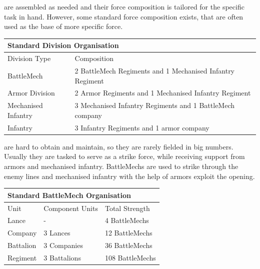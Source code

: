 \documentclass{tufte-book}
\begin{document}
 are assembled as needed and their force
composition is tailored for the specific task in hand. However, some
standard force composition exists, that are often used as the base of
more specific force.

\bigskip
\begin{minipage}{\textwidth}
\begin{center}
\begin{tabular}{ll}
\toprule
\multicolumn{2}{l}{Standard Division Organisation} \\
\midrule
Division Type & Composition \\
\midrule
BattleMech          & 2 BattleMech Regiments and 1 Mechanised Infantry Regiment \\
Armor Division      & 2 Armor Regiments and 1 Mechanised Infantry Regiment \\
Mechanised Infantry & 3 Mechanised Infantry Regiments and 1 BattleMech company\\
Infantry            & 3 Infantry Regiments and 1 armor company \\
\bottomrule
\end{tabular}
\end{center}
\end{minipage}

 are hard to obtain and maintain, so they are
rarely fielded in big numbers. Usually they are tasked to serve as a
strike force, while receiving support from armors and mechanised
infantry. BattleMechs are used to strike through the enemy lines and
mechanised infantry with the help of armors exploit the opening.

\bigskip
\begin{minipage}{\textwidth}
\begin{center}
\begin{tabular}{lll}
\toprule
\multicolumn{3}{l}{Standard BattleMech Organisation} \\
\midrule
Unit & Component Units & Total Strength \\
\midrule
Lance     & -            & 4 BattleMechs \\
Company   & 3 Lances     & 12 BattleMechs \\
Battalion & 3 Companies  & 36 BattleMechs \\
Regiment  & 3 Battalions & 108 BattleMechs \\
\bottomrule
\end{tabular}
\end{center}
\end{minipage}
\end{document}
